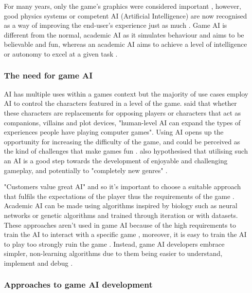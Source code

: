 \documentclass[11pt, a4paper]{article}
\begin{document}
For many years, only the game's graphics were considered important \parencites{yap2002grid, blow2004game}, however, good physics systems or competent AI (Artificial Intelligence) are now recognised as a way of improving the end-user's experience just as much \parencite{blow2004game}. Game AI is different from the normal, academic AI as it simulates behaviour and aims to be believable and fun, whereas an academic AI aims to achieve a level of intelligence or autonomy to excel at a given task \parencite[60]{nareyek2004ai}.

\subsubsection{The need for game AI}

AI has multiple uses within a games context but the majority of use cases employ AI to control the characters featured in a level of the game. \citeauthor{laird2001human} \parencite*[16]{laird2001human} said that whether these characters are replacements for opposing players or characters that act as companions, villains and plot devices, "human-level AI can expand the types of experiences people have playing computer games". Using AI opens up the opportunity for increasing the difficulty of the game, and could be perceived as the kind of challenges that make games fun \parencite[2]{buro2004call}. \citeauthor{laird2001human} \parencite*[16]{laird2001human} also hypothesised that utilising such an AI is a good step towards the development of enjoyable and challenging gameplay, and potentially to "completely new genres" \parencite[17]{laird2001human}.

 "Customers value great AI" \parencite[60]{nareyek2004ai} and so it's important to choose a suitable approach that fulfils the expectations of the player thus the requirements of the game \parencite[19]{millington2019ai}. Academic AI can be made using algorithms inspired by biology such as neural networks or genetic algorithms and trained through iteration or with datasets. These approaches aren't used in game AI because of the high requirements to train the AI to interact with a specific game \parencite[64]{nareyek2004ai}, moreover, it is easy to train the AI to play too strongly ruin the game \parencite[13]{tozour2002evolution}. Instead, game AI developers embrace simpler, non-learning algorithms due to them being easier to understand, implement and debug \parencite[7]{tozour2002evolution}.

 \subsubsection{Approaches to game AI development}
\end{document}
